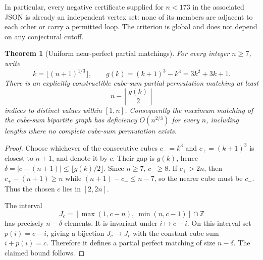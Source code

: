 \documentclass[10pt]{article}
\newtheorem{theorem}{Theorem}
\begin{document}
In particular, every negative
certificate supplied for $n<173$ in
the associated JSON is already an
independent vertex set: none of its
members are adjacent to each other
or carry a permitted loop.
The criterion is global and does not
depend on any conjectural cutoff.

\begin{theorem}[Uniform near-perfect partial matchings]
\label{thm:nearperfect}
For every integer $n\ge7$, write
\[
k=\lfloor(n+1)^{1/3}\rfloor,\qquad
g(k)=(k+1)^3-k^3=3k^2+3k+1.
\]
There is an explicitly constructible
cube-sum \emph{partial permutation}
matching at least
\begin{equation}\label{eq:nearperfect}
\boxed{\displaystyle
n-\left\lfloor\frac{g(k)}2\right\rfloor}
\end{equation}
indices to distinct values within $[1,n]$.
Consequently the maximum matching of
the cube-sum bipartite graph has
deficiency $O(n^{2/3})$ for \emph{every}
$n$, including lengths where no
complete cube-sum permutation exists.
\end{theorem}
\begin{proof}
Choose whichever of the consecutive cubes
$c_-=k^3$ and $c_+=(k+1)^3$
is closest to $n+1$, and denote it by $c$.
Their gap is $g(k)$, hence
$\delta=|c-(n+1)|\le\lfloor g(k)/2\rfloor$.
Since $n\ge7$, $c_-\ge8$.
If $c_+>2n$, then
$c_+-(n+1)\ge n$ while
$(n+1)-c_-\le n-7$, so the nearer
cube must be $c_-$. Thus the chosen
$c$ lies in $[2,2n]$.

The interval
\[
J_c=[\max(1,c-n),\ \min(n,c-1)]
\cap\mathbb Z
\]
has precisely $n-\delta$ elements.
It is invariant under $i\mapsto c-i$.
On this interval set $p(i)=c-i$,
giving a bijection $J_c\to J_c$
with the constant cube sum $i+p(i)=c$.
Therefore it defines a partial perfect
matching of size $n-\delta$.
The claimed bound follows.
\end{proof}
\end{document}
